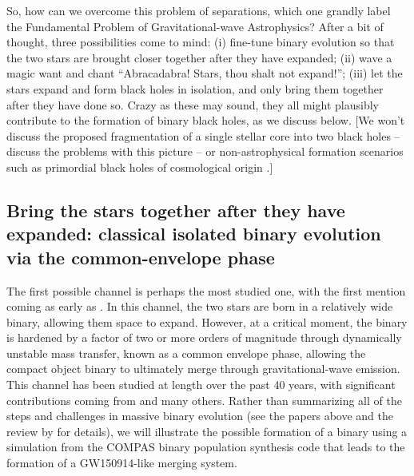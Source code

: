 \documentclass[iop,onecolumn]{revtex4}
\newcommand{\todo}[1]{\textcolor{red}{#1}}
\begin{document}

So, how can we overcome this problem of separations, which one grandly label the Fundamental Problem of Gravitational-wave Astrophysics?  After a bit of thought, three possibilities come to mind: (i) fine-tune binary evolution so that the two stars are brought closer together after they have expanded; (ii) wave a magic want and chant ``Abracadabra! Stars, thou shalt not expand!''; (iii) let the stars expand and form black holes in isolation, and only bring them together after they have done so.  Crazy as these may sound, they all might plausibly contribute to the formation of binary black holes, as we discuss below.  [We won't discuss the proposed fragmentation of a single stellar core into two black holes \citep{Loeb:2016} -- \citet{Woosley:2016,Dai:2016} discuss the problems with this picture -- or non-astrophysical formation scenarios such as primordial black holes of cosmological origin \citep[e.g.,][]{Kamionkowski}.]

\subsection{Bring the stars together after they have expanded: classical isolated binary evolution via the common-envelope phase}

The first possible channel is perhaps the most studied one, with the first mention coming as early as \citet{TutukovYungelson:1973}.  In this channel, the two stars are born in a relatively wide binary, allowing them space to expand.  However, at a critical moment, the binary is hardened by a factor of two or more orders of magnitude through dynamically unstable mass transfer, known as a common envelope phase, allowing the compact object binary to ultimately merge through gravitational-wave emission.  This channel has been studied at length over the past 40 years, with significant contributions coming from \citet{TutukovYungelson:1993,Lipunov:1997,BetheBrown:1998,DeDonderVanbeveren:2004,Nelemans:2003,VossTauris:2003,Pfahl:2005,Dewi:2006,Kalogera:2007,OShaughnessy:2008,Dominik:2012,Dominik:2014, Belczynski:2016,EldridgeStanway:2016} and many others.  Rather than summarizing all of the steps and challenges in massive binary evolution (see the papers above and the review by \citet{PostnovYungelson:2014} for details), we will illustrate the possible formation of a binary using a simulation from the COMPAS binary population synthesis code \citep{Stevenson:2017} that leads to the formation of a GW150914-like merging system.
\end{document}
